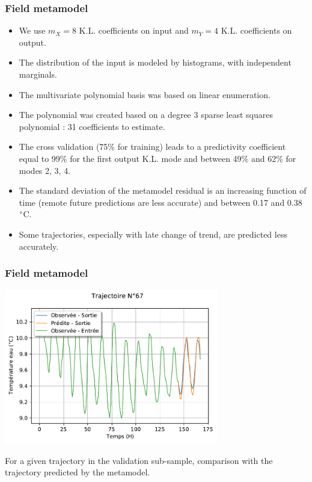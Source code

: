 \documentclass[10pt]{beamer}
\begin{document}

\begin{frame}
\frametitle{Field metamodel}

\begin{itemize}
\item We use $m_X = 8$ K.L. coefficients on input and $m_Y = 4$ K.L. coefficients on output.

\item The distribution of the input is modeled by histograms, with independent 
marginals. 

\item The multivariate polynomial basis was based on linear enumeration. 

\item The polynomial was created based on a degree 3 sparse least squares 
polynomial : 31 coefficients to estimate. 

\item The cross validation (75\% for training) leads to a predictivity 
coefficient equal to 99\% for the first output K.L. mode and 
between 49\% and 62\% for modes 2, 3, 4. 

\item The standard deviation of the metamodel residual is an increasing function 
of time (remote future predictions are less accurate) and between 0.17 
and 0.38~$\degree$C. 

\item Some trajectories, especially with late change of trend, are 
predicted less accurately. 
\end{itemize}
\end{frame}


\begin{frame}
\frametitle{Field metamodel}

\begin{center}
\includegraphics[width=0.7\textwidth]{figures/validation-chaos-observation-vs-prediction.pdf}
\end{center}

For a given trajectory in the validation sub-sample, comparison with the 
trajectory predicted by the metamodel.

\end{frame}
\end{document}
